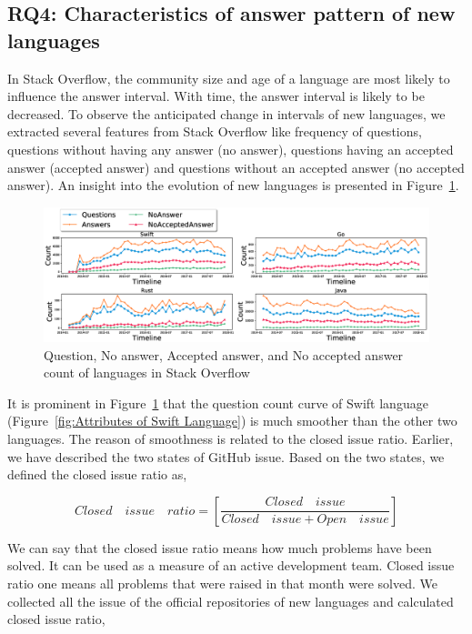 \subsection{RQ4: Characteristics of answer pattern of new languages}
\label{RQ3}
In Stack Overflow, the community size and age of a language are most likely to influence the answer interval. With time, the answer interval is likely to be decreased. To observe the anticipated change in intervals of new languages, we extracted several features from Stack Overflow like frequency of questions, questions without having any answer (no answer), questions having an accepted answer (accepted answer) and questions without an accepted answer (no accepted answer). An insight into the evolution of new languages is presented in Figure~\ref{fig:Evolution of new languages}.

\begin{figure}[htbp]

\includegraphics[scale=0.28]{figures/Evolution.eps} 
\caption{Question, No answer, Accepted answer, and No accepted answer count of languages in Stack Overflow}
\label{fig:Evolution of new languages}
\end{figure}

\iffalse
It is prominent in Figure~\ref{fig:Evolution of new languages} that the question count curve of Swift language (Figure~\ref{fig:Attributes of Swift Language}) is much smoother than the other two languages. The reason of smoothness is related to the closed issue ratio. Earlier, we have described the two states of GitHub issue. Based on the two states, we defined the closed issue ratio as,

\begin{equation}
{Closed \quad issue \quad ratio=}
\left[\dfrac{Closed\quad issue}
{Closed\quad issue+Open\quad issue}\right]
\label{eq:Closed Issue Ratio}
\end{equation}

We can say that the closed issue ratio means how much problems have been solved. It can be used as a measure of an active development team. Closed issue ratio one means all problems that were raised in that month were solved. We collected all the issue of the official repositories of new languages and calculated closed issue ratio,

